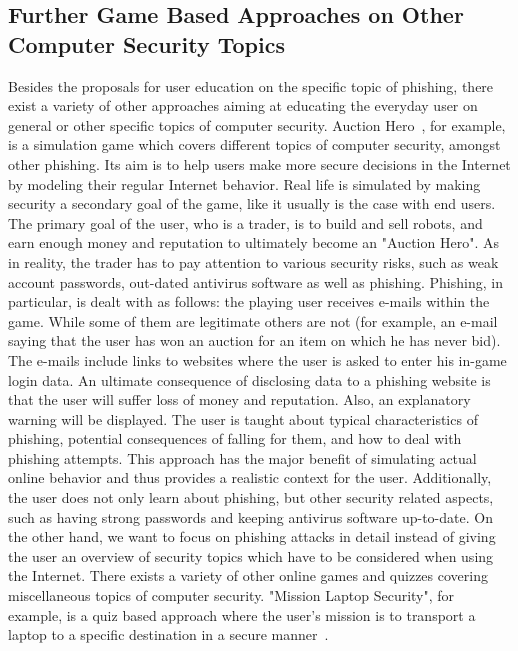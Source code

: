 \subsection{Further Game Based Approaches on Other Computer Security Topics}
Besides the proposals for user education on the specific topic of phishing, there exist a variety of other approaches aiming at educating the everyday user on general or other specific topics of computer security.
Auction Hero~\cite{chiasson2011auction}, for example, is a simulation game which covers different topics of computer security, amongst other phishing. 
Its aim is to help users make more secure decisions in the Internet by modeling their regular Internet behavior. 
Real life is simulated by making security a secondary goal of the game, like it usually is the case with end users. 
The primary goal of the user, who is a trader, is to build and sell robots, and earn enough money and reputation to ultimately become an "Auction Hero". 
As in reality, the trader has to pay attention to various security risks, such as weak account passwords, out-dated antivirus software as well as phishing. 
Phishing, in particular, is dealt with as follows: the playing user receives e-mails within the game. While some of them are legitimate others are not (for example, an e-mail saying that the user has won an auction for an item on which he has never bid). 
The e-mails include links to websites where the user is asked to enter his in-game login data. 
An ultimate consequence of disclosing data to a phishing website is that the user will suffer loss of money and reputation. 
Also, an explanatory warning will be displayed. 
The user is taught about typical characteristics of phishing, potential consequences of falling for them, and how to deal with phishing attempts. 
This approach has the major benefit of simulating actual online behavior and thus provides a realistic context for the user. 
Additionally, the user does not only learn about phishing, but other security related aspects, such as having strong passwords and keeping antivirus software up-to-date. 
On the other hand, we want to focus on phishing attacks in detail instead of giving the user an overview of security topics which have to be considered when using the Internet.
There exists a variety of other online games and quizzes covering miscellaneous topics of computer security.
"Mission Laptop Security", for example, is a quiz based approach where the user's mission is to transport a laptop to a specific destination in a secure manner~\cite{laptopsecurity}. 
